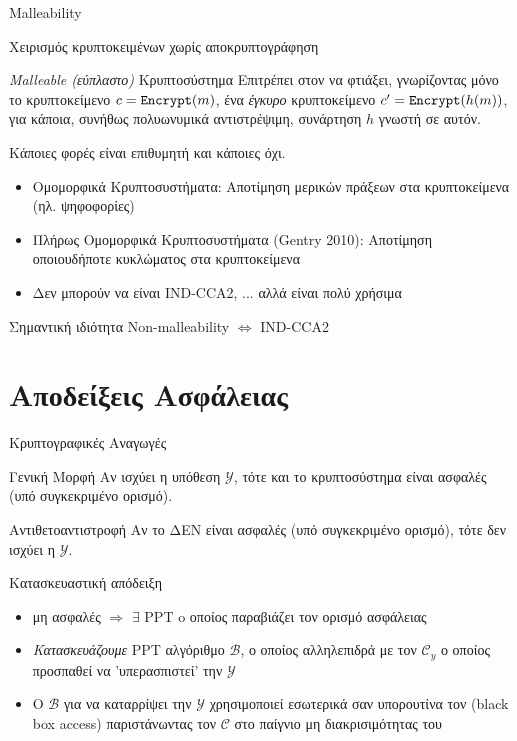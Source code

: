 \documentclass[handout]{beamer}
\begin{document}
\begin{frame}{Malleability}

Χειρισμός κρυπτοκειμένων χωρίς αποκρυπτογράφηση

\begin{block}{\emph{Malleable (εύπλαστο)} Κρυπτοσύστημα}
Επιτρέπει στον \adv να φτιάξει, γνωρίζοντας μόνο το κρυπτοκείμενο $c=\mathtt{Encrypt}(m)$, ένα \emph{έγκυρο} κρυπτοκείμενο $c'=\mathtt{Encrypt}(h(m))$, για κάποια, συνήθως πολυωνυμικά αντιστρέψιμη, συνάρτηση $h$ γνωστή σε αυτόν. 
\end{block}

\pause
Κάποιες φορές είναι επιθυμητή και κάποιες όχι.
\begin{itemize}
\item Ομομορφικά Κρυπτοσυστήματα: Αποτίμηση μερικών πράξεων στα κρυπτοκείμενα (ηλ. ψηφοφορίες) \pause
\item Πλήρως Ομομορφικά Κρυπτοσυστήματα (Gentry 2010): Αποτίμηση οποιουδήποτε κυκλώματος στα κρυπτοκείμενα \pause
\item Δεν μπορούν να είναι IND-CCA2, ... αλλά είναι πολύ χρήσιμα \pause
\end{itemize}
\pause
\begin{block}{Σημαντική ιδιότητα}
Non-malleability $\Leftrightarrow$ IND-CCA2
\end{block}
\end{frame}

\section{Αποδείξεις Ασφάλειας}

\begin{frame}{Κρυπτογραφικές Αναγωγές}
\begin{block}{Γενική Μορφή}
Αν ισχύει η υπόθεση $\mathcal{Y}$, τότε και το κρυπτοσύστημα \cs είναι ασφαλές (υπό συγκεκριμένο ορισμό).
\end{block}
\pause

\begin{block}{Αντιθετοαντιστροφή}
Αν το \cs ΔΕΝ είναι ασφαλές (υπό συγκεκριμένο ορισμό), τότε δεν ισχύει η $\mathcal{Y}$.
\end{block}
\end{frame}

\begin{frame}{Κατασκευαστική απόδειξη}
 
\begin{itemize}
\item \cs μη ασφαλές $\Rightarrow$ $\exists$ PPT \adv  o οποίος παραβιάζει τον ορισμό ασφάλειας
\item \emph{Κατασκευάζουμε} PPT αλγόριθμο  $\mathcal{B}$, ο οποίος αλληλεπιδρά με τον $\mathcal{C}_y$ ο οποίος προσπαθεί να 'υπερασπιστεί' την $\mathcal{Y}$
\item Ο $\mathcal{B}$ για να καταρρίψει την $\mathcal{Y}$ χρησιμοποιεί εσωτερικά σαν υπορουτίνα τον \adv (black box access) παριστάνωντας τον $\mathcal{C}$ στο παίγνιο μη διακρισιμότητας του \cs
\end{itemize}
\end{frame}
\end{document}
